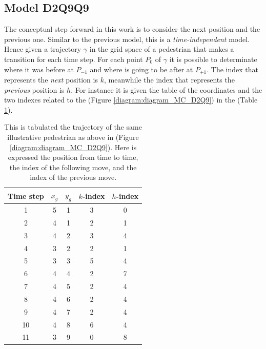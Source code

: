 \documentclass[class=article, crop=false]{standalone}
\begin{document}
\FloatBarrier
\newpage
\subsection{Model D2Q9Q9}
The conceptual step forward in this work is to consider the next position and the previous one.
Similar to the previous model, this is a \emph{time-independent} model.
Hence given a trajectory $\gamma$ in the grid space of a pedestrian that makes a transition for each time step.
For each point $P_0$ of $\gamma$ it is possible to determinate where it was before at $P_{-1}$ and where is going to be after at $P_{+1}$.
The index that represents the \emph{next} position is $k$, meanwhile the index that represents the \emph{previous} position is $h$.
For instance it is given the table of the coordinates and the two indexes related to the (Figure \ref{diagram:diagram_MC_D2Q9}) in the (Table \ref{table:diagram_MC_D2Q9}).
\begin{table}[h!]
\centering
\begin{tabular}{|c|c|c|c|c|}
\hline
Time step & $x_g$ & $y_g$ & $k$-index & $h$-index  \\ \hline
1         & 5 & 1 & 3 & 0 \\ \hline
2         & 4 & 1 & 2 & 1 \\ \hline
3         & 4 & 2 & 3 & 4 \\ \hline
4         & 3 & 2 & 2 & 1 \\ \hline
5         & 3 & 3 & 5 & 4 \\ \hline
6         & 4 & 4 & 2 & 7 \\ \hline
7         & 4 & 5 & 2 & 4 \\ \hline
8         & 4 & 6 & 2 & 4 \\ \hline
9         & 4 & 7 & 2 & 4 \\ \hline
10        & 4 & 8 & 6 & 4 \\ \hline
11        & 3 & 9 & 0 & 8 \\ \hline
\end{tabular}
\captionsetup{width=.6\linewidth}
\caption{This is tabulated the trajectory of the same illustrative pedestrian as above in (Figure \ref{diagram:diagram_MC_D2Q9}).
Here is expressed the position from time to time, the index of the following move, and the index of the previous move.}
\label{table:diagram_MC_D2Q9}
\end{table}
\end{document}
